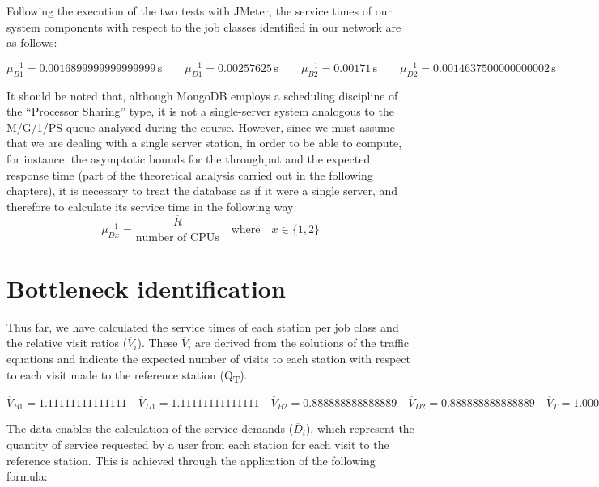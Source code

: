 Following the execution of the two tests with JMeter, the service times of our system components with respect to the job classes identified in our network are as follows:

\[
\mu^{-1}_{B1} = \num[round-mode=places, round-precision=5]{0.0016899999999999999} \, \text{s}
\quad \quad
\mu^{-1}_{D1} = \num[round-mode=places, round-precision=5]{0.00257625} \, \text{s}
\quad \quad
\mu^{-1}_{B2} = \num[round-mode=places, round-precision=5]{0.00171} \, \text{s}
\quad \quad
\mu^{-1}_{D2} = \num[round-mode=places, round-precision=5]{0.0014637500000000002} \, \text{s}
\]

It should be noted that, although MongoDB employs a scheduling discipline of the ``Processor Sharing'' type, it is not a single-server system analogous to the M/G/1/PS queue analysed during the course.
However, since we must assume that we are dealing with a single server station, in order to be able to compute, for instance, the asymptotic bounds for the throughput and the expected response time (part of the theoretical analysis carried out in the following chapters), it is necessary to treat the database as if it were a single server, and therefore to calculate its service time in the following way:
\[
	\mu^{-1}_{Dx} = \frac{\overline{R}}{\text{number of CPUs}} \quad \text{where} \quad x \in \{1, 2\}
\]

\section{Bottleneck identification}

Thus far, we have calculated the service times of each station per job class and the relative visit ratios ($\overline{V}_{i}$).
These $\overline{V}_{i}$ are derived from the solutions of the traffic equations and indicate the expected number of visits to each station with respect to each visit made to the reference station (Q\textsubscript{T}).

\[
\overline{V}_{B1} = \num[round-mode=places, round-precision=5]{1.11111111111111}
\quad
\overline{V}_{D1} = \num[round-mode=places, round-precision=5]{1.11111111111111}
\quad
\overline{V}_{B2} = \num[round-mode=places, round-precision=5]{0.888888888888889}
\quad
\overline{V}_{D2} = \num[round-mode=places, round-precision=5]{0.888888888888889}
\quad
\overline{V}_{T} = \num[round-mode=places, round-precision=5]{1.00000000000000}
\]

The data enables the calculation of the service demands ($\overline{D}_i$), which represent the quantity of service requested by a user from each station for each visit to the reference station.
This is achieved through the application of the following formula:

